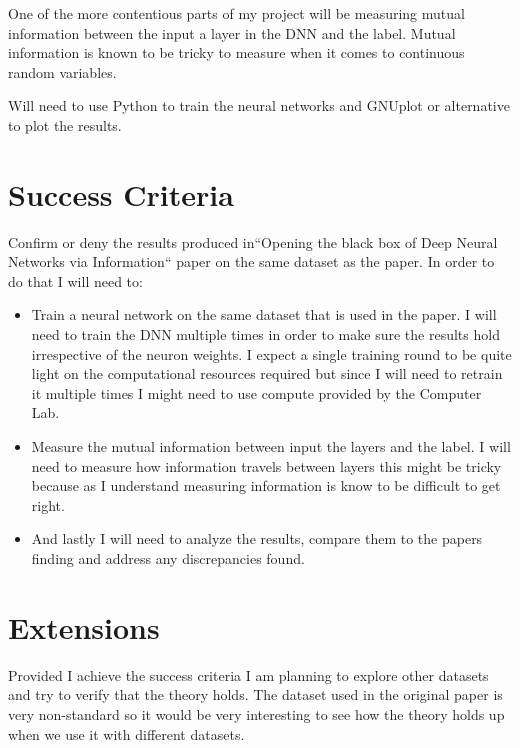 \documentclass[12pt]{article}
\begin{document}
One of the more contentious parts of my project will be measuring mutual
information between the input a layer in the DNN and the label. Mutual
information is known to be tricky to measure when it comes to continuous random
variables.

Will need to use Python to train the neural networks and GNUplot or alternative
to plot the results.



\section*{Success Criteria}

Confirm or deny the results produced in``Opening the black box of Deep Neural
Networks via Information`` paper on the same dataset as the paper. In order to do
that I will need to:

\begin{itemize}
  \item Train a neural network on the same dataset that is used in the paper. I
    will need to train the DNN multiple times in order to make sure the results
    hold irrespective of the neuron weights. I expect a single training round to
    be quite light on the computational resources required but since I will need
    to retrain it multiple times I might need to use compute provided by the
    Computer Lab.
  \item Measure the mutual information between input the layers and the label. I
    will need to measure how information travels between layers this might be
    tricky because as I understand measuring information is know to be difficult
    to get right.
  \item And lastly I will need to analyze the results, compare them to the
    papers finding and address any discrepancies found.
\end{itemize}

\section*{Extensions}

Provided I achieve the success criteria I am planning to explore other datasets
and try to verify that the theory holds.
The dataset used in the original paper is very non-standard so it would be very
interesting to see how the theory holds up when we use it with different
datasets.
\end{document}
